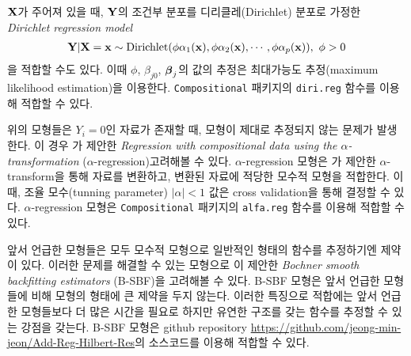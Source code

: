 $\mathbf{X}$가 주어져 있을 때, $\mathbf{Y}$의 조건부 분포를 디리클레(Dirichlet) 분포로 가정한 \textit{Dirichlet regression model}
\begin{equation}\label{eqn:dirireg}
    \begin{gathered}
        \mathbf{Y}|\mathbf{X}=\mathbf{x} \sim \text{Dirichlet}(\phi \alpha_1(\mathbf{x}), \phi \alpha_2(\mathbf{x}),\cdots, \phi \alpha_p(\mathbf{x})),~\phi > 0
    \end{gathered}
\end{equation}
을 적합할 수도 있다. 이때 $\phi$, $\beta_{j0}$, $\boldsymbol{\beta}_j$의 값의 추정은 최대가능도 추정(maximum likelihood estimation)을 이용한다. \texttt{Compositional} 패키지의 \texttt{diri.reg} 함수를 이용해 적합할 수 있다.

위의 모형들은 $Y_i=0$인 자료가 존재할 때, 모형이 제대로 추정되지 않는 문제가 발생한다. 이 경우 \citet{tsagris2015regression}가 제안한 \textit{Regression with compositional data using the $\alpha$-transformation} ($\alpha$-regression)\를 고려해볼 수 있다. $\alpha$-regression 모형은 \citet{tsagris2011data}가 제안한 $\alpha$-transform을 통해 자료를 변환하고, 변환된 자료에 적당한 모수적 모형을 적합한다. 이때, 조율 모수(tunning parameter) $|\alpha|<1$ 값은 cross validation을 통해 결정할 수 있다. $\alpha$-regression 모형은 \texttt{Compositional} 패키지의 \texttt{alfa.reg} 함수를 이용해 적합할 수 있다.

앞서 언급한 모형들은 모두 모수적 모형으로 일반적인 형태의 함수를 추정하기엔 제약이 있다. 이러한 문제를 해결할 수 있는 모형으로 \citet{jeon2018additive}이 제안한 \textit{Bochner smooth backfitting estimators} (B-SBF)을 고려해볼 수 있다. B-SBF 모형은 앞서 언급한 모형들에 비해 모형의 형태에 큰 제약을 두지 않는다. 이러한 특징으로 적합에는 앞서 언급한 모형들보다 더 많은 시간을 필요로 하지만 유연한 구조를 갖는 함수를 추정할 수 있는 강점을 갖는다. B-SBF 모형은 github repository \url{https://github.com/jeong-min-jeon/Add-Reg-Hilbert-Res}의 소스코드를 이용해 적합할 수 있다.